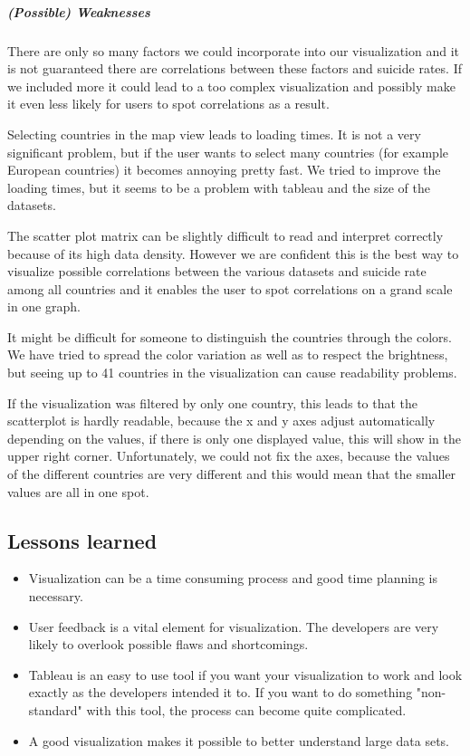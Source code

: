 \documentclass{vgtc}                          %
\begin{document}
\subparagraph{(Possible) Weaknesses}
There are only so many factors we could incorporate into our visualization and it is not guaranteed there are correlations between these factors and suicide rates. If we included more it could lead to a too complex visualization and possibly make it even less likely for users to spot correlations as a result.

Selecting countries in the map view leads to loading times. It is not a very significant problem, but if the user wants to select many countries (for example European countries) it becomes annoying pretty fast. We tried to improve the loading times, but it seems to be a problem with tableau and the size of the datasets.

The scatter plot matrix can be slightly difficult to read and interpret correctly because of its high data density. However we are confident this is the best way to visualize possible correlations between the various datasets and suicide rate among all countries and it enables the user to spot correlations on a grand scale in one graph.

It might be difficult for someone to distinguish the countries through the colors. We have tried to spread the color variation as well as to respect the brightness, but seeing up to 41 countries in the visualization can cause readability problems.

If the visualization was filtered by only one country, this leads to that the scatterplot is hardly readable, because the x and y axes adjust automatically depending on the values, if there is only one displayed value, this will show in the upper right corner. Unfortunately, we could not fix the axes, because the values of the different countries are very different and this would mean that the smaller values are all in one spot.

\subsection{Lessons learned}

\begin{itemize}
\item Visualization can be a time consuming process and good time planning is necessary.
\item User feedback is a vital element for visualization. The developers are very likely to overlook possible flaws and shortcomings.
\item Tableau is an easy to use tool if you want your visualization to work and look exactly as the developers intended it to. If you want to do something "non-standard" with this tool, the process can become quite complicated.
\item A good visualization makes it possible to better understand large data sets.
\end{itemize}
\end{document}
